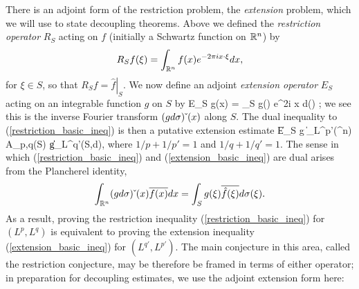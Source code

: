 \documentclass[brochure,english,12pt]{bourbaki}%
\begin{document}
There is an adjoint form of the restriction problem, the \emph{extension} problem, which we will use to state decoupling theorems. Above we defined the  \emph{restriction operator} $R_S$ acting on $f$ (initially  a Schwartz function on $\mathbb{R}^n$) by 
\[ R_S f(\xi) = \int_{\mathbb{R}^n}  f(x) e^{-2\pi i x \cdot \xi} dx , \]
for $\xi \in S$, so that $R_Sf  = \left. \hat{f} \right|_S$.
We now define an adjoint \emph{extension operator} $E_S$ acting on an integrable function $g$ on $S$ by 
\beq\label{extension_operator_dfn}
 E_S g(x) = \int_S g(\xi) e^{2\pi i x \cdot \xi} d\sig(\xi) ;
 \eeq
we see this is the inverse Fourier transform $(gd \sigma)\check{\;} (x)$ along $S$. 
The dual inequality to (\ref{restriction_basic_ineq}) is then a putative extension estimate 
\beq\label{extension_basic_ineq}
\| E_S  g \|_{L^{p'}(\R^n)} \leq A_{p,q}(S) \|g\|_{L^{q'}(S,d\sig)},
\eeq
where $1/p+1/p'=1$ and $1/q+1/q'=1$. 
The sense in which (\ref{restriction_basic_ineq}) and (\ref{extension_basic_ineq}) are dual arises from the Plancherel identity, 
\[ 
\int_{\mathbb{R}^n} (gd\sigma)\check{\;}(x) \overline{f(x)} dx = \int_{S} g(\xi) \overline{\hat{f}(\xi)} d\sigma(\xi).
\]
As a result, proving the restriction inequality (\ref{restriction_basic_ineq}) for $(L^p,L^q)$ is equivalent to proving the extension inequality (\ref{extension_basic_ineq}) for $(L^{q'},L^{p'})$. The main conjecture in this area, called the restriction conjecture, may be therefore be framed in terms of either operator; in preparation for decoupling estimates, we use the adjoint extension form here:
 
\end{document}
